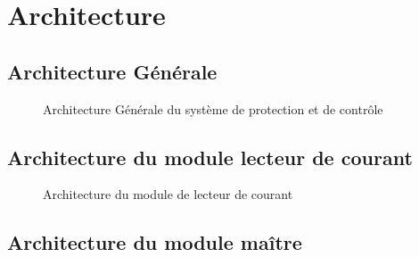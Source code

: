 \section{Architecture}
	
	\subsection{Architecture Générale}
		\begin{figure}[H]
			\centering
			\caption{Architecture Générale du système de protection et de contrôle}
			\label{fig:architecture_generale}
		\end{figure}
	
	\subsection{Architecture du module lecteur de courant}
		\begin{figure}[H]
			\centering
			\caption{Architecture du module de lecteur de courant}
			\label{fig:architecturelecturecourant}
		\end{figure}
	\subsection{Architecture du module maître}
	
